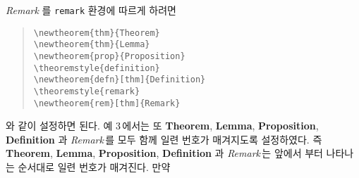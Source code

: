 \documentclass[a4paper,10pt]{amsproc}
\newcommand\env[1]{\texttt{#1}}
\newlength\hunindentlen
\def\gethunindentlen#1{%
 \sbox{\mybox}{\textbf{#1.}}%
 \setlength\hunindentlen{\wd\mybox}%
 \addtolength\hunindentlen{5mm}%
}
\begin{document}
\textit{Remark} 를 \env{remark} 환경에 따르게 하려면
\begin{quote}
\noindent\gethunindentlen{예 3}
\hspace*{-\hunindentlen}\usebox{\mybox}\hspace{4mm}\verb|\newtheorem{thm}{Theorem}| \\
   \verb|\newtheorem{thm}{Lemma}| \\
   \verb|\newtheorem{prop}{Proposition}| \\
   \verb|\theoremstyle{definition}|\\
   \verb|\newtheorem{defn}[thm]{Definition}| \\
   \verb|\theoremstyle{remark}| \\
   \verb|\newtheorem{rem}[thm]{Remark}| 
\end{quote}
와 같이 설정하면 된다. 예 3\,에서는 또 \textbf{Theorem}, \textbf{Lemma},
\textbf{Proposition}, \textbf{Definition} 과 \textit{Remark}\,를 모두
함께 일련 번호가 매겨지도록 설정하였다. 즉 \textbf{Theorem},
\textbf{Lemma}, \textbf{Proposition}, \textbf{Definition} 과
\textit{Remark}\,는 앞에서 부터 나타나는 순서대로 일련 번호가
매겨진다. 만약
\end{document}
